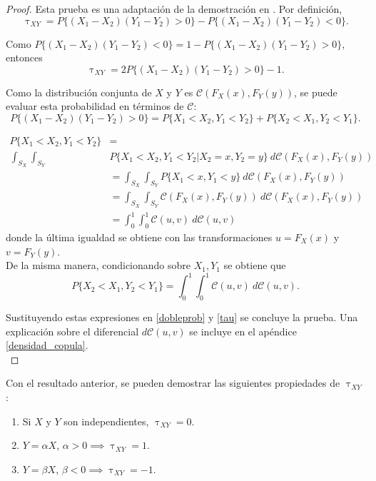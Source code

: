 \documentclass[11pt,a4paper]{article}
\begin{document}
\begin{proof} Esta prueba es una adaptación de la demostración en \citet{nelsen}.
Por definición, $$\uptau_{XY} = P\{(X_1-X_2)(Y_1-Y_2) > 0\} - P\{(X_1-X_2)(Y_1-Y_2) < 0\}.$$

Como $P\{(X_1-X_2)(Y_1-Y_2) < 0\} = 1-P\{(X_1-X_2)(Y_1-Y_2) > 0\}$, entonces
\begin{equation} \label{tau}
\uptau_{XY} = 2P\{(X_1-X_2)(Y_1-Y_2) > 0\} - 1.
\end{equation}

Como la distribución conjunta de $X$ y $Y$ es $\mathcal{C}(F_X(x), F_Y(y))$, se puede evaluar esta probabilidad en términos de $\mathcal{C}$:
\begin{equation} \label{dobleprob}
P\{(X_1-X_2)(Y_1-Y_2) > 0\} = P\{X_1<X_2, Y_1<Y_2\} + P\{X_2<X_1, Y_2<Y_1\}.
\end{equation}

\begin{align*}
P\{X_1 < X_2, Y_1 < Y_2\} &=\\
\int_{S_X} \int_{S_Y} &P\{X_1 < X_2, Y_1 < Y_2 | X_2 = x, Y_2 = y\} \ d\mathcal{C}(F_X(x), F_Y(y))\\
&= \int_{S_X} \int_{S_Y} P\{X_1 < x, Y_1 < y\} \ d\mathcal{C}(F_X(x), F_Y(y))\\
&= \int_{S_X} \int_{S_Y} \mathcal{C}(F_X(x), F_Y(y)) \ d\mathcal{C}(F_X(x), F_Y(y))\\
&= \int_0^1 \int_0^1 \mathcal{C}(u, v) \ d\mathcal{C}(u, v)
\end{align*}
donde la última igualdad se obtiene con las transformaciones $u = F_X(x)$ y $v = F_Y(y)$.\\

De la misma manera, condicionando sobre $X_1, Y_1$ se obtiene que $$P\{X_2 < X_1, Y_2 < Y_1\} = \int_0^1 \int_0^1 \mathcal{C}(u, v) \ d\mathcal{C}(u, v).$$

Sustituyendo estas expresiones en \eqref{dobleprob} y \eqref{tau} se concluye la prueba. Una explicación sobre el diferencial $d\mathcal{C}(u, v)$ se incluye en el apéndice \ref{densidad_copula}.\\
\end{proof}

Con el resultado anterior, se pueden demostrar las siguientes propiedades de $\uptau_{XY}$ \citep{nelsen}:

\begin{enumerate}
\item Si $X$ y $Y$ son independientes, $\uptau_{XY} = 0$.
\item $Y = \alpha X$, $\alpha > 0 \implies \uptau_{XY} = 1$.
\item $Y = \beta X$, $\beta < 0 \implies \uptau_{XY} = -1$.
\end{enumerate}
\end{document}
